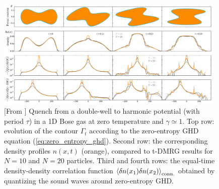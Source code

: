\documentclass[onecolumn,amsfonts,showpacs,superscriptaddress]{revtex4-1}
\begin{document}
\begin{figure}
    \centering
    \includegraphics[width=0.98\textwidth]{figures/qghd.png}
    \caption{[From \citep{ruggiero2020quantum}] Quench from a double-well to harmonic potential (with period $\tau$) in a 1D Bose gas at zero temperature and $\gamma \simeq 1$. Top row: evolution of the contour $\Gamma_t$ according to the zero-entropy GHD equation (\ref{eq:zero_entropy_ghd}). Second row: the corresponding density profiles $n(x,t)$ (orange), compared to t-DMRG results for $N=10$ and $N=20$ particles. Third and fourth rows: the equal-time density-density correlation function $\left< \delta n(x_1) \delta n(x_2) \right>_{\rm conn.}$ obtained by quantizing the sound waves around zero-entropy GHD.}
    \label{fig:qghd}
\end{figure}
\end{document}
